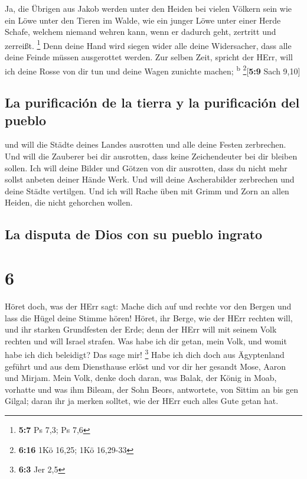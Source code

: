  Ja, die Übrigen aus Jakob werden unter den Heiden bei
vielen Völkern sein wie ein Löwe unter den Tieren im Walde, wie ein
junger Löwe unter einer Herde Schafe, welchem niemand wehren kann, wenn
er dadurch geht, zertritt und zerreißt. \footnote{\textbf{5:7} Ps 7,3;
  Ps 7,6}  Denn deine Hand wird siegen wider alle deine
Widersacher, dass alle deine Feinde müssen ausgerottet werden.
 Zur selben Zeit, spricht der HErr, will ich deine Rosse
von dir tun und deine Wagen zunichte machen; \textsuperscript{b}
\footnote{\textbf{6:16} 1Kö 16,25; 1Kö 16,29-33}{[}\textbf{5:9} Sach
9,10{]}

\hypertarget{la-purificaciuxf3n-de-la-tierra-y-la-purificaciuxf3n-del-pueblo}{%
\subsection{La purificación de la tierra y la purificación del
pueblo}\label{la-purificaciuxf3n-de-la-tierra-y-la-purificaciuxf3n-del-pueblo}}

 und will die Städte deines Landes ausrotten und alle
deine Festen zerbrechen.  Und will die Zauberer bei dir
ausrotten, dass keine Zeichendeuter bei dir bleiben sollen.
 Ich will deine Bilder und Götzen von dir ausrotten, dass
du nicht mehr sollst anbeten deiner Hände Werk.  Und will
deine Ascherabilder zerbrechen und deine Städte vertilgen.
 Und ich will Rache üben mit Grimm und Zorn an allen
Heiden, die nicht gehorchen wollen.

\hypertarget{la-disputa-de-dios-con-su-pueblo-ingrato}{%
\subsection{La disputa de Dios con su pueblo
ingrato}\label{la-disputa-de-dios-con-su-pueblo-ingrato}}

\hypertarget{section-5}{%
\section{6}\label{section-5}}

 Höret doch, was der HErr sagt: Mache dich auf und rechte
vor den Bergen und lass die Hügel deine Stimme hören! 
Höret, ihr Berge, wie der HErr rechten will, und ihr starken Grundfesten
der Erde; denn der HErr will mit seinem Volk rechten und will Israel
strafen.  Was habe ich dir getan, mein Volk, und womit
habe ich dich beleidigt? Das sage mir! \footnote{\textbf{6:3} Jer 2,5}
 Habe ich dich doch aus Ägyptenland geführt und aus dem
Diensthause erlöst und vor dir her gesandt Mose, Aaron und Mirjam.
 Mein Volk, denke doch daran, was Balak, der König in
Moab, vorhatte und was ihm Bileam, der Sohn Beors, antwortete, von
Sittim an bis gen Gilgal; daran ihr ja merken solltet, wie der HErr euch
alles Gute getan hat.

